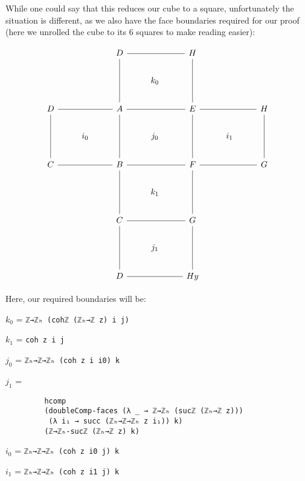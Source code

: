While one could say that this reduces our cube to a square, unfortunately the situation is different, as we also have the face boundaries required for our proof (here we unrolled the cube to its 6 squares to make reading easier):

\[\begin{tikzcd}
	&& D && H \\
	&&& {k_0} \\
	D && A && E && H \\
	& {i_0} && {j_0} && {i_1} \\
	C && B && F && G \\
	&&& {k_1} \\
	&& C && G \\
	&&& {j_1} \\
	&& D && H
	\arrow[no head, from=1-3, to=1-5]
	\arrow[no head, from=1-3, to=3-3]
y	\arrow[no head, from=1-5, to=3-5]
	\arrow[no head, from=3-1, to=5-1]
	\arrow[no head, from=3-3, to=3-1]
	\arrow[no head, from=3-3, to=3-5]
	\arrow[no head, from=3-3, to=5-3]
	\arrow[no head, from=3-5, to=3-7]
	\arrow[no head, from=3-5, to=5-5]
	\arrow[no head, from=5-1, to=5-3]
	\arrow[no head, from=5-3, to=5-5]
	\arrow[no head, from=5-3, to=7-3]
	\arrow[no head, from=5-5, to=5-7]
	\arrow[no head, from=5-7, to=3-7]
	\arrow[no head, from=7-3, to=7-5]
	\arrow[no head, from=7-5, to=5-5]
	\arrow[no head, from=7-5, to=9-5]
	\arrow[no head, from=9-3, to=7-3]
	\arrow[no head, from=9-5, to=9-3]
\end{tikzcd}\]

Here, our required boundaries will be:
\begin{compactitem}
  \item $k_0$ = \texttt{ℤ→ℤₕ (cohℤ (ℤₕ→ℤ z) i j)}
  \item $k_1$ = \texttt{coh z i j}
  \item $j_0$ = \texttt{ℤₕ→ℤ→ℤₕ (coh z i i0) k}
  \item $j_1$ = \begin{verbatim}
         hcomp
         (doubleComp-faces (λ _ → ℤ→ℤₕ (sucℤ (ℤₕ→ℤ z)))
          (λ i₁ → succ (ℤₕ→ℤ→ℤₕ z i₁)) k)
         (ℤ→ℤₕ-sucℤ (ℤₕ→ℤ z) k)
         \end{verbatim}
  \item $i_0$ = \texttt{ℤₕ→ℤ→ℤₕ (coh z i0 j) k}
  \item $i_1$ = \texttt{ℤₕ→ℤ→ℤₕ (coh z i1 j) k}
\end{compactitem}

